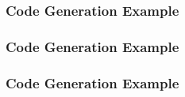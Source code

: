 \begin{frame}
  \frametitle{Code Generation Example}
  \scriptsize
  
\end{frame}

\begin{frame}
  \frametitle{Code Generation Example}
  \tiny
  
\end{frame}

\begin{frame}
  \frametitle{Code Generation Example}
  \scriptsize
  
\end{frame}
